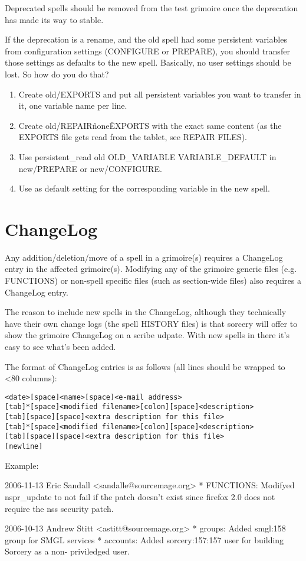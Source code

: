 \documentclass[a4paper,10pt]{book}
\begin{document}
Deprecated spells should be removed from the test grimoire once the
deprecation has made its way to stable.

If the deprecation is a rename, and the old spell had some persistent
variables from configuration settings (CONFIGURE or PREPARE), you should
transfer those settings as defaults to the new spell. Basically, no user
settings should be lost. So how do you do that?
\begin{enumerate}
\item Create old/EXPORTS and put all persistent variables you want to
	transfer in it, one variable name per line.
\item Create old/REPAIR\^none\^EXPORTS with the exact same content (as the
	EXPORTS file gets read from the tablet, see REPAIR FILES).
\item Use persistent\_read old OLD\_VARIABLE VARIABLE\_DEFAULT in new/PREPARE
	or new/CONFIGURE.
\item Use  as default setting for
the
	corresponding variable in the new spell.
\end{enumerate}

\section{ChangeLog}
Any addition/deletion/move of a spell in a grimoire(s) requires a ChangeLog
entry in the affected grimoire(s). Modifying any of the grimoire generic
files (e.g. FUNCTIONS) or non-spell specific files (such as section-wide
files) also requires a ChangeLog entry.

The reason to include new spells in the ChangeLog, although they technically
have their own change logs (the spell HISTORY files) is that sorcery will offer
to show the grimoire ChangeLog on a scribe udpate. With new spells in there
it's easy to see what's been added.

The format of ChangeLog entries is as follows (all lines should be wrapped
to <80 columns):
\begin{verbatim}
<date>[space]<name>[space]<e-mail address>
[tab]*[space]<modified filename>[colon][space]<description>
[tab][space][space]<extra description for this file>
[tab]*[space]<modified filename>[colon][space]<description>
[tab][space][space]<extra description for this file>
[newline]
\end{verbatim}

Example:
\begin{verbatim*}
2006-11-13 Eric Sandall <sandalle@sourcemage.org>
	* FUNCTIONS: Modifyed nspr_update to not fail if the patch doesn't
	  exist	since firefox 2.0 does not require the nss security patch.

2006-10-13 Andrew Stitt <astitt@sourcemage.org>
	* groups: Added smgl:158 group for SMGL services
	* accounts: Added sorcery:157:157 user for building Sorcery as a non-
	  priviledged user.
\end{verbatim*}
\end{document}
